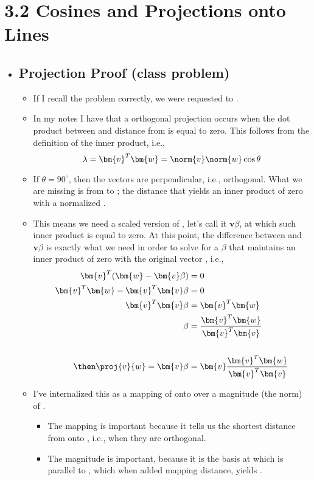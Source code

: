 \section{3.2 Cosines and Projections onto Lines}
\begin{itemize}
  \item []

  \subsection{Projection Proof (class problem)}
  \begin{itemize}
    \item If I recall the problem correctly, we were requested to .

    \item In my notes I have that a orthogonal projection occurs when the dot
      product between  and distance  from  is equal to
      zero. This follows from the definition of the inner product, i.e.,
      \[%
      \lambda = \bm{v}^T \bm{w} = \norm{v} \norm{w} \cos \theta
      \]%
    \item If \(\theta = 90^\circ\), then the vectors are perpendicular, i.e.,
      orthogonal. What we are missing is  from  to
      ; the distance that yields an inner product of zero with a
      normalized  .
    \item This means we need a scaled version of , let's call it
      \(\bm{v}\beta\), at which such inner product is equal to zero. At this
      point, the difference between  and \(\bm{v}\beta\) is exactly what
      we need in order to solve for a \(\beta\) that maintains an inner
      product of zero with the original vector , i.e.,
      \begin{align*}
        \bm{v}^T (\bm{w}-\bm{v}\beta) &= 0 \\
        \bm{v}^T\bm{w}-\bm{v}^T \bm{v}\beta &= 0 \\
        \bm{v}^T \bm{v}\beta &= \bm{v}^T\bm{w} \\
        \beta &= \frac{\bm{v}^T\bm{w}}{\bm{v}^T \bm{v}}\\\\
        \then
        \proj{v}{w} = \bm{v}\beta &= \bm{v}\frac{\bm{v}^T\bm{w}}{\bm{v}^T \bm{v}}
      \end{align*}
    \item I've internalized this as a mapping of  onto
       over a magnitude (the norm) of .
      \begin{itemize}
        \item The mapping is important because it tells us the shortest
          distance from  onto , i.e., when they are orthogonal.
        \item The magnitude is important, because it is the basis at which
           is parallel to , which when added mapping distance,
          yields .
      \end{itemize}
  \end{itemize}


\end{itemize}
